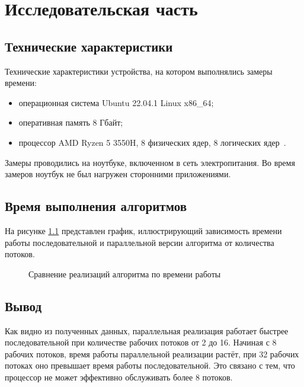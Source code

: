 \chapter{Исследовательская часть}

\section{Технические характеристики}

Технические характеристики устройства, на котором выполнялись замеры времени:

\begin{itemize}
	\item операционная система Ubuntu 22.04.1 Linux x86\_64;
	\item оперативная память 8 Гбайт;
	\item процессор AMD Ryzen 5 3550H, 8 физических ядер, 8 логических ядер~\cite{amd}.
\end{itemize}

Замеры проводились на ноутбуке, включенном в сеть электропитания. Во время замеров ноутбук не был нагружен сторонними приложениями.

\section{Время выполнения алгоритмов}
На рисунке \ref{img:g1} представлен график, иллюстрирующий зависимость времени работы последовательной и параллельной версии алгоритма от количества потоков.

\clearpage
\begin{figure}[h!]
	\centering
	\caption{Сравнение реализаций алгоритма по времени работы}
	\label{img:g1}
\end{figure}

\section*{Вывод}
Как видно из полученных данных, параллельная реализация работает быстрее последовательной при количестве рабочих потоков от 2 до 16.
Начиная с 8 рабочих потоков, время работы параллельной реализации растёт, при 32
рабочих потоках оно превышает время работы последовательной.
Это связано с тем, что процессор не может эффективно обслуживать более 8 потоков.
